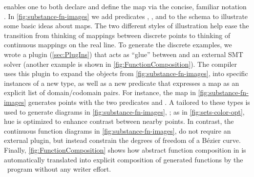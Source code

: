    \noindent enables one to both declare and define the map via the concise, familiar notation .  In \cref{fig:substance-fn-images} we add predicates , , and  to the \Domain{} schema to illustrate some basic ideas about maps.  The two different styles of illustration help ease the transition from thinking of mappings between discrete points to thinking of continuous mappings on the real line.  To generate the discrete examples, we wrote a plugin (\cref{sec:PlugIns}) that acts as ``glue'' between \Penrose{} and an external SMT solver (another example is shown in \cref{fig:FunctionComposition}).  The compiler uses this plugin to expand the  objects from \cref{fig:substance-fn-images},  into specific instances of a new  type, as well as a new predicate  that expresses a map as an explicit list of domain/codomain pairs.  For instance, the map in \cref{fig:substance-fn-images} generates points  with the two predicates  and .  A \Style{} tailored to these types is used to generate diagrams in \cref{fig:substance-fn-images}, ; as in \cref{fig:sets-color-opt}, hue is optimized to enhance contrast between nearby points.  In contrast, the continuous function diagrams in \cref{fig:substance-fn-images},  do not require an external plugin, but instead constrain the degrees of freedom of a B\'{e}zier curve.  Finally, \cref{fig:FunctionComposition} shows how abstract function composition in \Substance{} is automatically translated into explicit composition of generated functions by the \Style\ program without any \Substance{} writer effort.


